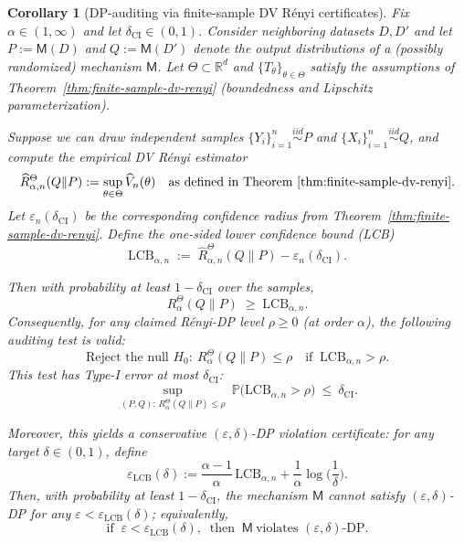 \documentclass{article}
\theoremstyle{plain}
\newtheorem{corollary}[theorem]{Corollary}
\theoremstyle{definition}
\theoremstyle{remark}
\begin{document}
\begin{corollary}[DP-auditing via finite-sample DV R\'enyi certificates]
\label{cor:dp-auditing-dv-renyi-app}
Fix $\alpha\in(1,\infty)$ and let $\delta_{\mathrm{CI}}\in(0,1)$.
Consider neighboring datasets $D,D'$ and let $P:=\mathsf{M}(D)$ and $Q:=\mathsf{M}(D')$
denote the output distributions of a (possibly randomized) mechanism $\mathsf{M}$.
Let $\Theta\subset\mathbb{R}^d$ and $\{T_\theta\}_{\theta\in\Theta}$ satisfy the assumptions of
Theorem~\ref{thm:finite-sample-dv-renyi} (boundedness and Lipschitz parameterization).

Suppose we can draw independent samples
$\{Y_i\}_{i=1}^n\stackrel{iid}{\sim}P$ and $\{X_i\}_{i=1}^n\stackrel{iid}{\sim}Q$,
and compute the empirical DV R\'enyi estimator
\[
\widehat R_{\alpha,n}^{\Theta}(Q\|P):=\sup_{\theta\in\Theta}\widehat V_n(\theta)
\quad\text{as defined in Theorem~\ref{thm:finite-sample-dv-renyi}.}
\]
Let $\varepsilon_n(\delta_{\mathrm{CI}})$ be the corresponding confidence radius from
Theorem~\ref{thm:finite-sample-dv-renyi}.
Define the one-sided lower confidence bound (LCB)
\[
\mathrm{LCB}_{\alpha,n}
\;:=\;
\widehat R_{\alpha,n}^{\Theta}(Q\|P)-\varepsilon_n(\delta_{\mathrm{CI}}).
\]

Then with probability at least $1-\delta_{\mathrm{CI}}$ over the samples,
\[
R_\alpha^{\Theta}(Q\|P)\;\ge\;\mathrm{LCB}_{\alpha,n}.
\]
Consequently, for any claimed R\'enyi-DP level $\rho\ge 0$ (at order $\alpha$),
the following \emph{auditing test} is valid:
\[
\text{Reject the null }H_0:\ R_\alpha^{\Theta}(Q\|P)\le \rho
\quad\text{if }\ \mathrm{LCB}_{\alpha,n}>\rho .
\]
This test has Type-I error at most $\delta_{\mathrm{CI}}$:
\[
\sup_{(P,Q):\,R_\alpha^{\Theta}(Q\|P)\le \rho}\ 
\mathbb{P}\big(\mathrm{LCB}_{\alpha,n}>\rho\big)\ \le\ \delta_{\mathrm{CI}}.
\]

Moreover, this yields a conservative $(\varepsilon,\delta)$-DP \emph{violation certificate}:
for any target $\delta\in(0,1)$, define
\[
\varepsilon_{\mathrm{LCB}}(\delta)
:=
\frac{\alpha-1}{\alpha}\,\mathrm{LCB}_{\alpha,n}
+\frac{1}{\alpha}\log\!\Big(\frac{1}{\delta}\Big).
\]
Then, with probability at least $1-\delta_{\mathrm{CI}}$,
the mechanism $\mathsf{M}$ cannot satisfy $(\varepsilon,\delta)$-DP for any
$\varepsilon<\varepsilon_{\mathrm{LCB}}(\delta)$; equivalently,
\[
\text{if }\ \varepsilon<\varepsilon_{\mathrm{LCB}}(\delta),\ \text{ then }\ \mathsf{M}\ \text{violates }(\varepsilon,\delta)\text{-DP}.
\]
\end{corollary}
\end{document}
